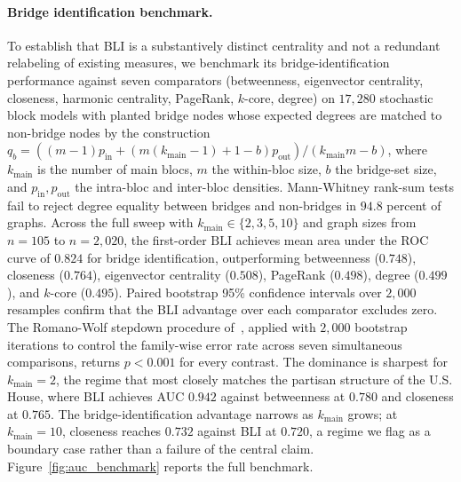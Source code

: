 \documentclass[12pt, a4paper]{article}
\begin{document}
\paragraph{Bridge identification benchmark.} To establish that BLI is a substantively distinct centrality and not a redundant relabeling of existing measures, we benchmark its bridge-identification performance against seven comparators (betweenness, eigenvector centrality, closeness, harmonic centrality, PageRank, $k$-core, degree) on $17{,}280$ stochastic block models with planted bridge nodes whose expected degrees are matched to non-bridge nodes by the construction $q_b = ((m-1) p_{\mathrm{in}} + (m(k_{\mathrm{main}} - 1) + 1 - b) p_{\mathrm{out}}) / (k_{\mathrm{main}} m - b)$, where $k_{\mathrm{main}}$ is the number of main blocs, $m$ the within-bloc size, $b$ the bridge-set size, and $p_{\mathrm{in}}, p_{\mathrm{out}}$ the intra-bloc and inter-bloc densities. Mann-Whitney rank-sum tests fail to reject degree equality between bridges and non-bridges in $94.8$ percent of graphs. Across the full sweep with $k_{\mathrm{main}} \in \{2, 3, 5, 10\}$ and graph sizes from $n = 105$ to $n = 2{,}020$, the first-order $\mathrm{BLI}$ achieves mean area under the ROC curve of $0.824$ for bridge identification, outperforming betweenness ($0.748$), closeness ($0.764$), eigenvector centrality ($0.508$), PageRank ($0.498$), degree ($0.499$), and $k$-core ($0.495$). Paired bootstrap 95\% confidence intervals over $2{,}000$ resamples confirm that the BLI advantage over each comparator excludes zero. The Romano-Wolf stepdown procedure of~\citet{romano2005stepwise}, applied with $2{,}000$ bootstrap iterations to control the family-wise error rate across seven simultaneous comparisons, returns $p < 0.001$ for every contrast. The dominance is sharpest for $k_{\mathrm{main}} = 2$, the regime that most closely matches the partisan structure of the U.S. House, where BLI achieves AUC $0.942$ against betweenness at $0.780$ and closeness at $0.765$. The bridge-identification advantage narrows as $k_{\mathrm{main}}$ grows; at $k_{\mathrm{main}} = 10$, closeness reaches $0.732$ against BLI at $0.720$, a regime we flag as a boundary case rather than a failure of the central claim. Figure~\ref{fig:auc_benchmark} reports the full benchmark.
\end{document}

